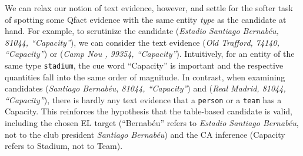 We can relax our notion of text evidence, however, and settle for the softer task of spotting some 
Qfact evidence with the same entity {\em type}
as the candidate at hand.
For example, to scrutinize the candidate
(\textit{Estadio Santiago Bernab\'{e}u, 81044, ``Capacity''}), we can consider the text evidence
(\textit{Old Trafford, 74140, ``Capacity''}) or (\textit{Camp Nou
, 99354, ``Capacity''}).
Intuitively, 
for an entity of the
same type {\small\tt stadium}, the cue word 
``Capacity'' is important and the respective quantities
fall into the same order of magnitude.
In contrast, when examining candidates (\textit{Santiago Bernab\'{e}u, 81044, ``Capacity''}) and (\textit{Real Madrid, 81044, ``Capacity''}), 
there is hardly any
text evidence that a {\small\tt person} or a  {\small\tt team} has a Capacity. 
This reinforces the hypothesis that the table-based candidate is valid, including the chosen EL target (``Bernab\'{e}u'' refers to {\it Estadio Santiago Bernab\'{e}u}, not to the club president {\it Santiago Bernab\'{e}u}) and the CA inference (Capacity refers to Stadium, not to Team).

